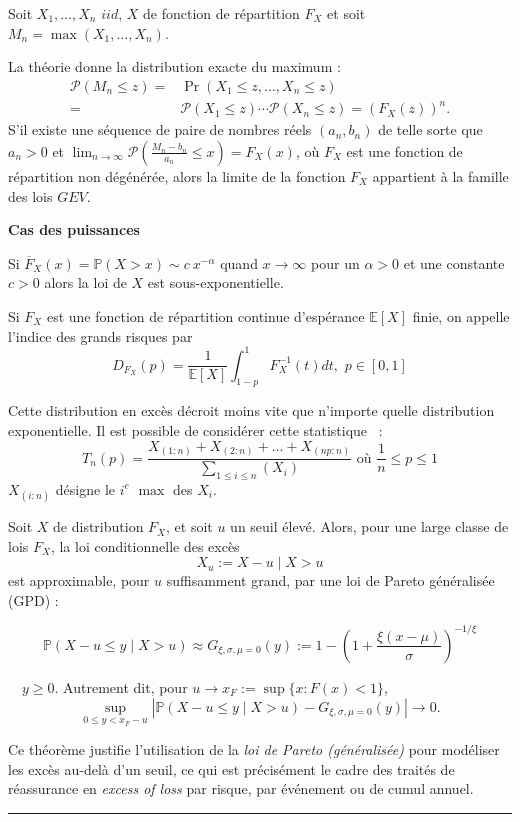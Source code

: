 \begin{f} 

	Soit \(X_1, \dots, X_n\)  \(iid\), \(X\) de fonction de répartition \(F_X\) et soit \(M_n =\max(X_1,\dots,X_n)\).
	
	La théorie donne la distribution exacte du maximum :
\begin{align*}
		\mathcal{P}(M_n \leq z) = &\Pr(X_1 \leq z, \dots, X_n \leq z) \\
		 = &\mathcal{P}(X_1 \leq z) \cdots \mathcal{P}(X_n \leq z) = (F_X(z))^n. 
\end{align*}
	S'il existe une séquence de paire de nombres réels \((a_n, b_n)\) de telle sorte que \(a_n>0\) et \(\lim_{n \to \infty}\mathcal{P}\left(\frac{M_n-b_n}{a_n}\leq x\right) = F_X(x)\), où \(F_X\) est une fonction de répartition non dégénérée, alors la limite de la fonction \(F_X\) appartient à la famille des lois \(GEV\). 

\end{f}

\begin{f}
	
	\textbf{Cas des puissances} 
	
	Si \(\overline{F}_{X}(x)=\mathbb{P}(X > x)\sim c\ x^{-\alpha}\)
		quand \(x \to \infty \) pour un \(\alpha > 0 \) et une constante \(c > 0 \) alors la loi de \(X\)
		est sous-exponentielle.
	
		Si \(F_X\) est une fonction de répartition continue d'espérance \(\mathbb{E}[X]\) finie, on appelle l'indice des grands risques par
		\[
		D_{F_X}(p)=\frac{1}{\mathbb{E}[X]}\int_{1-p}^{1} F_X^{-1}(t)dt,\, \, p\in [0,1]
		\]

	Cette distribution en excès décroit moins vite que n'importe quelle distribution exponentielle.
	Il est possible de considérer cette statistique ~:
	\[
	T_n(p)=\frac{X_{(1:n)}+X_{(2:n)}+\ldots + X_{(np:n)}}{\sum_{1\leq i\leq n}(X_i)} \mbox{ où } \frac{1}{n}\leq p\leq 1
	\]
	\(X_{(i:n)}\) désigne le \(i^e\) \(\max \) des \(X_i\).

\end{f}
\begin{f}
	Soit \(X\) de distribution \(F_X\), et soit \(u\) un seuil élevé. Alors, pour une large classe de lois \(F_X\), la loi conditionnelle des excès
	\[
	X_u := X - u \mid X > u
	\]
	est approximable, pour \(u\) suffisamment grand, par une loi de Pareto généralisée (GPD) :
	
	\[
	\mathbb{P}(X - u \le y \mid X > u) \approx G_{\xi, \sigma, \mu=0}(y) :=  1 - \left(1+ \frac{\xi(x-\mu)}{\sigma}\right)^{-1/\xi} 
	\]
	
	\(\quad y \ge 0\). Autrement dit, pour \(u \to x_F := \sup\{x : F(x) < 1\}\),
	\[
	\sup_{0 \le y < x_F - u} \left| \mathbb{P}(X - u \le y \mid X > u) - G_{\xi,\sigma,\mu=0}(y) \right| \to 0.
	\]
	
	Ce théorème justifie l’utilisation de la \textit{loi de Pareto (généralisée)} pour modéliser les excès au-delà d’un seuil, ce qui est précisément le cadre des traités de réassurance en \textit{excess of loss} par risque, par événement ou de cumul annuel. 
\end{f}
\hrule


